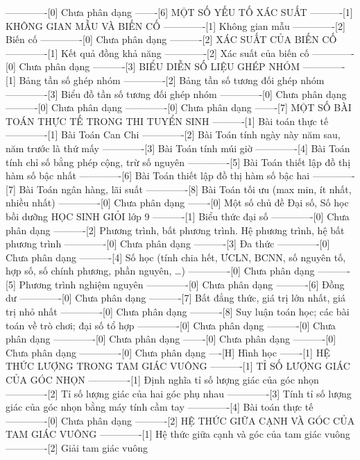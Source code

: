 -------------[0] Chưa phân dạng
-------[6] MỘT SỐ YẾU TỐ XÁC SUẤT
----------[1] KHÔNG GIAN MẪU VÀ BIẾN CỐ
-------------[1] Không gian mẫu
-------------[2] Biến cố
-------------[0] Chưa phân dạng
----------[2] XÁC SUẤT CỦA BIẾN CỐ
-------------[1] Kết quả đồng khả năng
-------------[2] Xác suất của biến cố
-------------[0] Chưa phân dạng
----------[3] BIỂU DIỄN SỐ LIỆU GHÉP NHÓM
-------------[1] Bảng tần số ghép nhóm
-------------[2] Bảng tần số tương đối ghép nhóm
-------------[3] Biểu đồ tần số tương đối ghép nhóm
-------------[0] Chưa phân dạng
----------[0] Chưa phân dạng
-------------[0] Chưa phân dạng
-------[7] MỘT SỐ BÀI TOÁN THỰC TẾ TRONG THI TUYỂN SINH
----------[1] Bài toán thực tế
-------------[1] Bài Toán Can Chi
-------------[2] Bài Toán tính ngày này năm sau, năm trước là thứ mấy
-------------[3] Bài Toán tính múi giờ
-------------[4] Bài Toán tính chỉ số bằng phép cộng, trừ số nguyên
-------------[5] Bài Toán thiết lập đồ thị hàm số bậc nhất
-------------[6] Bài Toán thiết lập đồ thị hàm số bậc hai
-------------[7] Bài Toán ngân hàng, lãi suất
-------------[8] Bài Toán tối ưu (max min, ít nhất, nhiều nhất)
-------------[0] Chưa phân dạng
-------[0] Một số chủ đề Đại số, Số học bồi dưỡng HỌC SINH GIỎI lớp 9
----------[1] Biểu thức đại số
-------------[0] Chưa phân dạng
----------[2] Phương trình, bất phương trình. Hệ phương trình, hệ bất phương trình
-------------[0] Chưa phân dạng
----------[3] Đa thức
-------------[0] Chưa phân dạng
----------[4] Số học (tính chia hết, ƯCLN, BCNN, số nguyên tố, hợp số, số chính phương, phần nguyên, \ldots)
-------------[0] Chưa phân dạng
----------[5] Phương trình nghiệm nguyên
-------------[0] Chưa phân dạng
----------[6] Đồng dư
-------------[0] Chưa phân dạng
----------[7] Bất đẳng thức, giá trị lớn nhất, giá trị nhỏ nhất
-------------[0] Chưa phân dạng
----------[8] Suy luận toán học; các bài toán về trò chơi; đại số tổ hợp
-------------[0] Chưa phân dạng
----------[0] Chưa phân dạng
-------------[0] Chưa phân dạng
-------[0] Chưa phân dạng
----------[0] Chưa phân dạng
-------------[0] Chưa phân dạng
----[H] Hình học
-------[1] HỆ THỨC LƯỢNG TRONG TAM GIÁC VUÔNG
----------[1] TỈ SỐ LƯỢNG GIÁC CỦA GÓC NHỌN
-------------[1] Định nghĩa tỉ số lượng giác của góc nhọn
-------------[2] Tỉ số lượng giác của hai góc phụ nhau
-------------[3] Tính tỉ số lượng giác của góc nhọn bằng máy tính cầm tay
-------------[4] Bài toán thực tế
-------------[0] Chưa phân dạng
----------[2] HỆ THỨC GIỮA CẠNH VÀ GÓC CỦA TAM GIÁC VUÔNG
-------------[1] Hệ thức giữa cạnh và góc của tam giác vuông
-------------[2] Giải tam giác vuông
